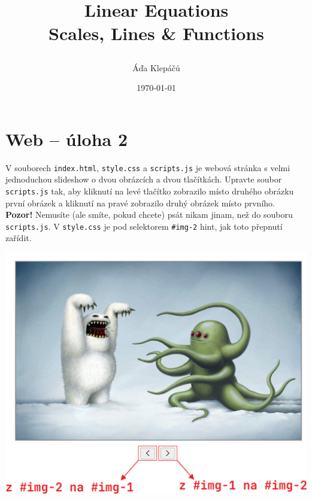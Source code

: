 \documentclass[a4paper,12pt]{article}
\title{\Huge\textsf{Linear Equations}\\
 \Large\textsf{Scales, Lines \& Functions}
 \author{Áďa Klepáčů}
 \date{\today}
}
\begin{document}
\thispagestyle{fancy}

\section*{Web -- úloha 2}

V souborech \texttt{index.html}, \texttt{style.css} a \texttt{scripts.js} je
webová stránka s velmi jednoduchou slideshow o dvou obrázcích a dvou tlačítkách.
Upravte soubor \texttt{scripts.js} tak, aby kliknutí na levé tlačítko zobrazilo
místo druhého obrázku první obrázek a kliknutí na pravé zobrazilo druhý obrázek
místo prvního.\\
\textbf{Pozor!} Nemusíte (ale smíte, pokud chcete) psát nikam jinam, než do
souboru \texttt{scripts.js}. V \texttt{style.css} je pod selektorem
\texttt{\#img-2} hint, jak toto přepnutí zařídit.

\begin{center}
 \includegraphics[width=.8\textwidth]{vzor.png}
\end{center}
\end{document}
